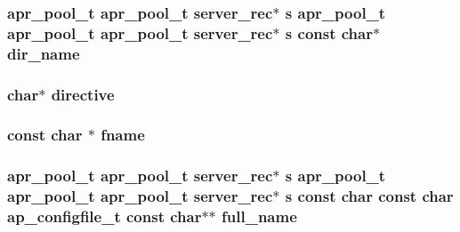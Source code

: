 \subsubsection[{\texorpdfstring{dir\+\_\+name}{dir_name}}]{ {\bf apr\+\_\+pool\+\_\+t} {\bf apr\+\_\+pool\+\_\+t} {\bf server\+\_\+rec}$\ast$ {\bf s} {\bf apr\+\_\+pool\+\_\+t} {\bf apr\+\_\+pool\+\_\+t} {\bf apr\+\_\+pool\+\_\+t} {\bf server\+\_\+rec}$\ast$ {\bf s} const char$\ast$ dir\+\_\+name}\hypertarget{group__APACHE__CORE__CONFIG_gac8621996b85ad6f9a37a597a54d26a34}{}\label{group__APACHE__CORE__CONFIG_gac8621996b85ad6f9a37a597a54d26a34}
\subsubsection[{\texorpdfstring{directive}{directive}}]{\setlength{\rightskip}{0pt plus 5cm}char$\ast$ directive}\hypertarget{group__APACHE__CORE__CONFIG_ga1b89c6a3ccbc534f73a9bc9606423682}{}\label{group__APACHE__CORE__CONFIG_ga1b89c6a3ccbc534f73a9bc9606423682}
\subsubsection[{\texorpdfstring{fname}{fname}}]{\setlength{\rightskip}{0pt plus 5cm}const char $\ast$ fname}\hypertarget{group__APACHE__CORE__CONFIG_gad427d00dcac2689669452fb7728f8617}{}\label{group__APACHE__CORE__CONFIG_gad427d00dcac2689669452fb7728f8617}
\subsubsection[{\texorpdfstring{full\+\_\+name}{full_name}}]{ {\bf apr\+\_\+pool\+\_\+t} {\bf apr\+\_\+pool\+\_\+t} {\bf server\+\_\+rec}$\ast$ {\bf s} {\bf apr\+\_\+pool\+\_\+t} {\bf apr\+\_\+pool\+\_\+t} {\bf apr\+\_\+pool\+\_\+t} {\bf server\+\_\+rec}$\ast$ {\bf s} const char const char {\bf ap\+\_\+configfile\+\_\+t} const char$\ast$$\ast$ full\+\_\+name}\hypertarget{group__APACHE__CORE__CONFIG_ga5f15e50a0851d3332ab805a1f20c1a4d}{}\label{group__APACHE__CORE__CONFIG_ga5f15e50a0851d3332ab805a1f20c1a4d}
